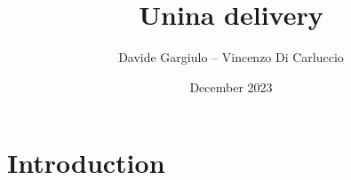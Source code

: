 \documentclass{uninaDeliveyClass}
\title{Unina delivery}
\author{Davide Gargiulo -- Vincenzo Di Carluccio}
\date{December 2023}
\begin{document}
\maketitle

\tableofcontents

\newpage

\section{Introduction}
\end{document}
